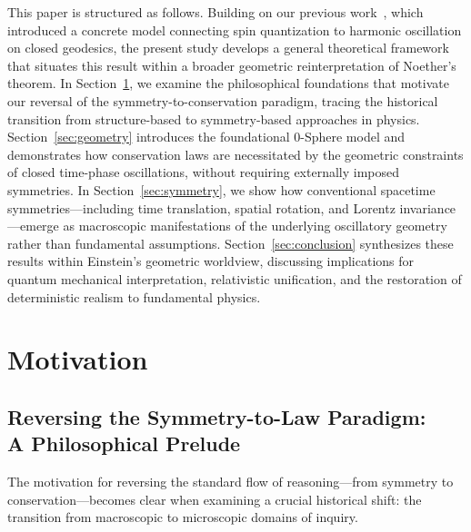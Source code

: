 \documentclass[%
 reprint,
 amsmath,amssymb,
 aps,
]{revtex4-1}
\numberwithin{equation}{section}%
\begin{document}
This paper is structured as follows. Building on our previous work~\cite{hanamura2506.0119,hanamura2507.0128}, which introduced a concrete model connecting spin quantization to harmonic oscillation on closed geodesics, the present study develops a general theoretical framework that situates this result within a broader geometric reinterpretation of Noether's theorem. In Section~\ref{sec:motivation}, we examine the philosophical foundations that motivate our reversal of the symmetry-to-conservation paradigm, tracing the historical transition from structure-based to symmetry-based approaches in physics. Section~\ref{sec:geometry} introduces the foundational 0-Sphere model and demonstrates how conservation laws are necessitated by the geometric constraints of closed time-phase oscillations, without requiring externally imposed symmetries. In Section~\ref{sec:symmetry}, we show how conventional spacetime symmetries—including time translation, spatial rotation, and Lorentz invariance—emerge as macroscopic manifestations of the underlying oscillatory geometry rather than fundamental assumptions. Section~\ref{sec:conclusion} synthesizes these results within Einstein's geometric worldview, discussing implications for quantum mechanical interpretation, relativistic unification, and the restoration of deterministic realism to fundamental physics.


\clearpage

\section{Motivation}
\label{sec:motivation}

\subsection{Reversing the Symmetry-to-Law Paradigm:\\ A Philosophical Prelude}

The motivation for reversing the standard flow of reasoning---from symmetry to conservation---becomes clear when examining a crucial historical shift: the transition from macroscopic to microscopic domains of inquiry.
\end{document}
